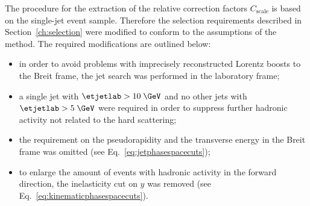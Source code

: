 The procedure for the extraction of the relative correction factors $C_\text{scale}$ is based on the single-jet event sample. Therefore the selection requirements described in Section~\ref{ch:selection} were modified to conform to the assumptions of the method. The required modifications are outlined below: 
\begin{itemize}
	\item in order to avoid problems with imprecisely reconstructed Lorentz boosts to the Breit frame, the jet search was performed in the laboratory frame;
	\item a single jet with $\etjetlab > 10\; \GeV$ and no other jets with $\etjetlab > 5\; \GeV$ were required in order to suppress further hadronic activity not related to the hard scattering;
	\item the requirement on the pseudorapidity and the transverse energy in the Breit frame was omitted (see Eq.~\eqref{eq:jetphasespacecuts});
	\item to enlarge the amount of events with hadronic activity in the forward direction, the inelasticity cut on $y$ was removed  (see Eq.~\eqref{eq:kinematicphasespacecuts}).
\end{itemize}

